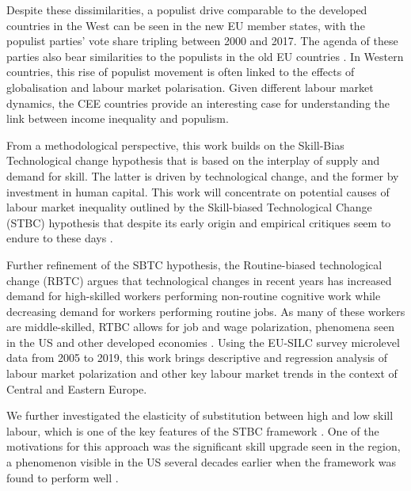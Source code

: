 \documentclass[11pt]{article}
\begin{document}
Despite these dissimilarities, a populist drive comparable to the developed countries in the West can be seen in the new EU member states, with the populist parties' vote share tripling between 2000 and 2017. The agenda of these parties also bear similarities to the populists in the old EU countries \citep{orenstein2022work}. In Western countries, this rise of populist movement is often linked to the effects of globalisation and labour market polarisation. Given different labour market dynamics, the CEE countries provide an interesting case for understanding the link between income inequality and populism. 



From a methodological perspective, this work builds on the Skill-Bias Technological change hypothesis \citep{katz1992changes} that is based on the interplay of supply and demand for skill. The latter is driven by technological change, and the former by investment in human capital. This work will concentrate on potential causes of labour market inequality outlined by the Skill-biased Technological Change (STBC) hypothesis that despite its early origin \citep{katz1992changes} and empirical critiques seem to endure to these days \citep{aziz2021between, goldin2020extending}.

Further refinement of the SBTC hypothesis, the Routine-biased technological change (RBTC)  argues that technological changes in recent years has increased demand for high-skilled workers performing non-routine cognitive work while decreasing demand for workers performing routine jobs. As many of these workers are middle-skilled, RTBC allows for  job and wage polarization, phenomena seen in the US and other developed economies \citep{rodrik2020economic, temin2018vanishing}. Using the EU-SILC survey microlevel data from 2005 to 2019, this work brings descriptive and regression analysis of labour market polarization and other key labour market trends in the context of Central and Eastern Europe.


We further investigated the elasticity of substitution between high and low skill labour, which is one of the key features of the STBC framework \citep{katz1992changes}. One of the motivations for this approach was the significant skill upgrade seen in the region, a phenomenon visible in the US several decades earlier when the framework was found to perform well \citep{hardy2018educational}.
\end{document}
